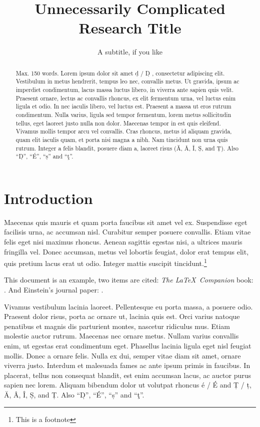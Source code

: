 \documentclass{jcls}
\title{Unnecessarily Complicated Research Title}
\subtitle{A subtitle, if you like}
\begin{document}
\maketitle

\begin{abstract}
    Max. 150 words. Lorem ipsum dolor sit amet d̦ / D̦ , consectetur adipiscing elit. Vestibulum in metus hendrerit, tempus leo nec, convallis metus. Ut gravida, ipsum ac imperdiet condimentum, lacus massa luctus libero, in viverra ante sapien quis velit. Praesent ornare, lectus ac convallis rhoncus, ex elit fermentum urna, vel luctus enim ligula et odio. In nec iaculis libero, vel luctus est. Praesent a massa ut eros rutrum condimentum. Nulla varius, ligula sed tempor fermentum, lorem metus sollicitudin tellus, eget laoreet justo nulla non dolor. Maecenas tempor in est quis eleifend. Vivamus mollis tempor arcu vel convallis. Cras rhoncus, metus id aliquam gravida, quam elit iaculis quam, et porta nisi magna a nibh. Nam tincidunt non urna quis rutrum. Integer a felis blandit, posuere diam a, laoreet risus  (Ă, Â, Î, Ș, and Ț). Also \enquote{D̦}, \enquote{É}, \enquote{ș} and \enquote{ţ}. 
\end{abstract}

\section{Introduction}

Maecenas quis mauris et quam porta faucibus sit amet vel ex. Suspendisse eget facilisis urna, ac accumsan nisl. Curabitur semper posuere convallis. Etiam vitae felis eget nisi maximus rhoncus. Aenean sagittis egestas nisi, a ultrices mauris fringilla vel. Donec accumsan, metus vel lobortis feugiat, dolor erat tempus elit, quis pretium lacus erat ut odio. Integer mattis suscipit tincidunt.\footnote{This is a footnote}

This document is an example, two items are cited: \textit{The \LaTeX\ Companion} book: \cite{latexcompanion}. And Einstein's journal paper: \cite{einstein}.

Vivamus vestibulum lacinia laoreet. Pellentesque eu porta massa, a posuere odio. Praesent dolor risus, porta ac ornare ut, lacinia quis est. Orci varius natoque penatibus et magnis dis parturient montes, nascetur ridiculus mus. Etiam molestie auctor rutrum. Maecenas nec ornare metus. Nullam varius convallis enim, ut egestas erat condimentum eget. Phasellus lacinia ligula eget nisl feugiat mollis. Donec a ornare felis. Nulla ex dui, semper vitae diam sit amet, ornare viverra justo. Interdum et malesuada fames ac ante ipsum primis in faucibus. In placerat, tellus non consequat blandit, est enim accumsan lacus, ac auctor purus sapien nec lorem. Aliquam bibendum dolor ut volutpat rhoncus é / É and Ț / ț, Ă, Â, Î, Ș, and Ț. Also \enquote{D̦}, \enquote{É}, \enquote{ș} and \enquote{ţ}. 
\end{document}
